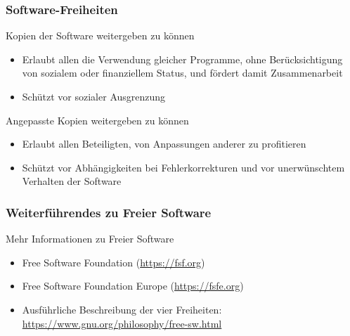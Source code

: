 \documentclass{beamer}
\begin{document}
\begin{frame}
  \frametitle{Software-Freiheiten}

  \onslide<+->

  \begin{block}{Kopien der Software weitergeben zu können}
    \begin{itemize}
    \item Erlaubt allen die Verwendung gleicher Programme, ohne Berücksichtigung
      von sozialem oder finanziellem Status, und fördert damit Zusammenarbeit
    \item Schützt vor sozialer Ausgrenzung
    \end{itemize}
  \end{block}

  \onslide<+->

  \begin{block}{Angepasste Kopien weitergeben zu können}
    \begin{itemize}
    \item Erlaubt allen Beteiligten, von Anpassungen anderer zu profitieren
    \item Schützt vor Abhängigkeiten bei Fehlerkorrekturen und vor unerwünschtem
      Verhalten der Software
    \end{itemize}
  \end{block}
\end{frame}

\begin{frame}
  \frametitle{Weiterführendes zu Freier Software}

  \onslide<+->

  \begin{block}{Mehr Informationen zu Freier Software}
    \begin{itemize}
    \item Free Software Foundation (\url{https://fsf.org})
    \item Free Software Foundation Europe (\url{https://fsfe.org})
    \item Ausführliche Beschreibung der vier Freiheiten:
      \url{https://www.gnu.org/philosophy/free-sw.html}
    \end{itemize}
  \end{block}

\end{frame}
\end{document}
